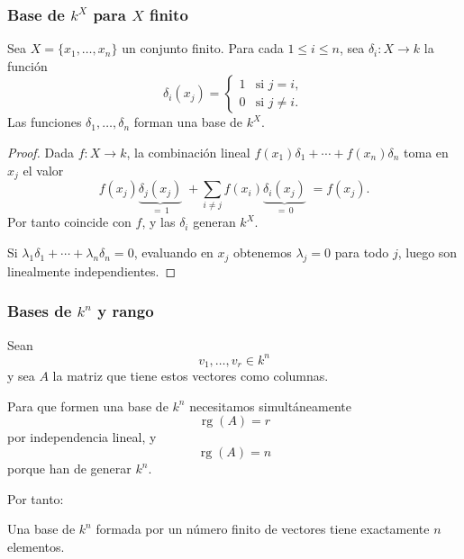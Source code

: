 \begin{frame}[allowframebreaks, t]
    \frametitle{Base de \(k^X\) para \(X\) finito}

    \begin{proposition}
        Sea \(X=\{x_1,\ldots,x_n\}\) un conjunto finito.
        Para cada \(1\leq i\leq n\), sea \(\delta_i\colon X\to k\) la función
        \[
            \delta_i(x_j)=
            \begin{cases}
                1 & \text{si }j=i,\\
                0 & \text{si }j\neq i.
            \end{cases}
        \]
        Las funciones \(\delta_1,\ldots,\delta_n\) forman una base de \(k^X\).
    \end{proposition}

    \begin{proof}
        Dada \(f\colon X\to k\), la combinación lineal
        \(f(x_1)\delta_1+\cdots+f(x_n)\delta_n\)
        toma en \(x_j\) el valor
        \[
            f(x_j)\underbrace{\delta_j(x_j)}_{=\,1}
            \;+\!\sum_{i\neq j}f(x_i)\underbrace{\delta_i(x_j)}_{=\,0}
            \;=f(x_j).
        \]
        Por tanto coincide con \(f\), y las \(\delta_i\) \alert{generan} \(k^X\).

        Si \(\lambda_1\delta_1+\cdots+\lambda_n\delta_n=0\),
        evaluando en \(x_j\) obtenemos \(\lambda_j=0\) para todo \(j\),
        luego son \alert{linealmente independientes}.
    \end{proof}
\end{frame}



\begin{frame}
    \frametitle{Bases de \(k^n\) y rango}

    Sean
    \[
        v_1,\ldots,v_r\in k^n
    \]
    y sea \(A\) la matriz que tiene estos vectores como columnas.

    Para que formen una base de \(k^n\) necesitamos simultáneamente
    \[
        \operatorname{rg}(A)=r
    \]
    por independencia lineal, y
    \[
        \operatorname{rg}(A)=n
    \]
    porque han de generar \(k^n\).

    Por tanto:

    \begin{corollary}
        Una base de \(k^n\) formada por un número finito de vectores
        tiene exactamente \(n\) elementos.
    \end{corollary}
\end{frame}


